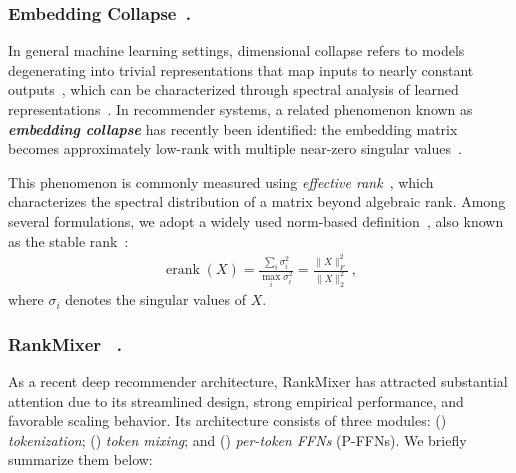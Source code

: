\documentclass[sigconf,screen]{acmart}
\newcommand{\rankmixer}{RankMixer }
\begin{document}
\subsubsection*{\bf Embedding Collapse~\cite{embedding-collapse-1-multiembedding}.} In general machine learning settings, dimensional collapse refers to models degenerating into trivial representations that map inputs to nearly constant outputs~\citep{dimension-collapse}, which can be characterized through spectral analysis of learned representations~\citep{dimension-collapse-svd}. 
In recommender systems, a related phenomenon known as \textit{\textbf{embedding collapse}} has recently been identified: the embedding matrix becomes approximately low-rank with multiple near-zero singular values~\citep{embedding-collapse-1-multiembedding,embedding-collapse-2,embedding-collapse-3,embedding-collapse-4-ulrec}. 

This phenomenon is commonly measured using \textit{effective rank}~\cite{effective-rank}, which characterizes the spectral distribution of a matrix beyond algebraic rank. 
Among several formulations, we adopt a widely used norm-based definition~\cite{norm-erank-1,norm-erank-3,norm-erank-4}, also known as the stable rank~\cite{norm-erank-2}:
\begin{align}\label{eq:norm-erank}
\operatorname{erank}(X) = \frac{\sum_{i}\sigma^2_i}{\max_i\sigma^2_i} 
= \frac{\|X\|_F^2}{\|X\|_2^2}\ ,
\end{align}
where \(\sigma_i\) denotes the singular values of \(X\).

\subsubsection*{\bf \rankmixer~\cite{rankmixer}.} As a recent deep recommender architecture, \rankmixer has attracted substantial attention due to its streamlined design, strong empirical performance, and favorable scaling behavior. 
Its architecture consists of three modules: (\textbf{}) \textit{tokenization}; (\textbf{}) \textit{token mixing}; and (\textbf{}) \textit{per-token FFNs} (P-FFNs). We briefly summarize them below:
\end{document}
